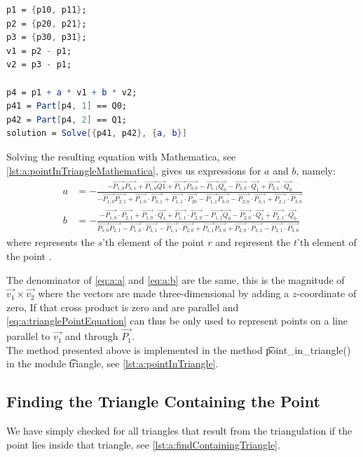 	\begin{lstlisting}[float, language=Mathematica, label={lst:a:pointInTriangleMathematica}, caption={Mathematica code used to compute the to compute $a$ and $b$.}]
p1 = {p10, p11};
p2 = {p20, p21};
p3 = {p30, p31};
v1 = p2 - p1;
v2 = p3 - p1;

p4 = p1 + a * v1 + b * v2;
p41 = Part[p4, 1] == Q0;
p42 = Part[p4, 2] == Q1;
solution = Solve[{p41, p42}, {a, b}]
	\end{lstlisting}

Solving the resulting equation with Mathematica, see \autoref{lst:a:pointInTriangleMathematica}, gives us expressions for $a$ and $b$, namely:
	\begin{align}
	a &= -\frac{-\vec{P_{1,0}} \vec{P_{3,1}}+\vec{P_{1,0}} \vec{Q1}+\vec{P_{1,1}} \vec{P_{3,0}}-\vec{P_{1,1}}
   \vec{Q_0} - \vec{P_{3,0}} \cdot \vec{Q_1}+\vec{P_{3,1}} \cdot \vec{Q_0}}{ - \vec{P_{1,0}}
   \vec{P_{2,1}}+\vec{P_{1,0}} \cdot \vec{P_{3,1}}+\vec{P_{1,1}} \cdot \vec{P_{20}} - \vec{P_{1,1}}
   \vec{P_{3,0}} - \vec{P_{2,0}} \cdot \vec{P_{3,1}}+\vec{P_{2,1}} \cdot \vec{P_{3,0}}}\label{eq:a:a}\\
	b &=  - \frac{ - \vec{P_{1,0}} \cdot \vec{P_{2,1}}+\vec{P_{1,0}} \cdot \vec{Q_1}+\vec{P_{1,1}} \cdot \vec{P_{2,0}} - \vec{P_{1,1}}
   \vec{Q_0} - \vec{P_{2,0}} \cdot \vec{Q_1}+\vec{P_{2,1}} \cdot \vec{Q_0}}{\vec{P_{1,0}}
   \vec{P_{2,1}} - \vec{P_{1,0}} \cdot \vec{P_{3,1}} - \vec{P_{1,1}} \cdot \vec{P_{2,0}}+\vec{P_{1,1}}
   \vec{P_{3,0}}+\vec{P_{2,0}} \cdot \vec{P_{3,1}} - \vec{P_{2,1}} \cdot \vec{P_{3,0}}}\label{eq:a:b}
	\end{align}
where  represents the $s$'th element of the point $r$ and  represent the $t$'th element of the point .

The denominator of \eqref{eq:a:a} and \eqref{eq:a:b} are the same, this is the magnitude of $\vec{v_1} \times \vec{v_2}$ where the vectors are made three-dimensional by adding a $z$-coordinate of zero, If that cross product is zero  and  are parallel and \eqref{eq:a:trianglePointEquation} can thus be only used to represent points on a line parallel to $\vec{v_1}$ and through $\vec{P_1}$. \\

The method presented above is implemented in the method \t{point_in_triangle()} in the module \t{triangle}, see \autoref{lst:a:pointInTriangle}.



\subsection{Finding the Triangle Containing the Point}
We have simply checked for all triangles that result from the triangulation if the point lies inside that triangle, see \autoref{lst:a:findContainingTriangle}.


